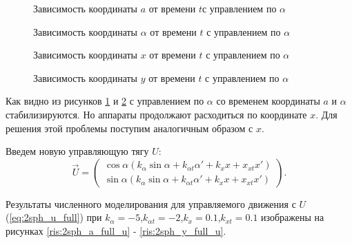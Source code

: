 \begin{figure}[H]
	\caption{Зависимость координаты $a$ от времени $t$с управлением по $\alpha$}
	\label{ris:2sph_a_alpha_u}
\end{figure}
\begin{figure}[H]
	\caption{Зависимость координаты $\alpha$ от времени $t$ с управлением по $\alpha$}
	\label{ris:2sph_alpha_alpha_u}
\end{figure} 
\begin{figure}[H]
	\caption{Зависимость координаты $x$ от времени $t$ с управлением по $\alpha$}
	\label{ris:2sph_x_alpha_u}
\end{figure} 
\begin{figure}[H]
	\caption{Зависимость координаты $y$ от времени $t$ с управлением по $\alpha$}
	\label{ris:2sph_y_alpha_u}
\end{figure} 

Как видно из рисунков \ref{ris:2sph_a_alpha_u} и \ref{ris:2sph_alpha_alpha_u} с управлением по $\alpha$ со временем координаты $a$ и $\alpha$ стабилизируются.
Но аппараты продолжают расходиться по координате $x$.
Для решения этой проблемы поступим аналогичным образом с $x$.

Введем новую управляющую тягу $U$:
\begin{equation}
\label{eq:2sph_u_full}
	\vec{U} = 
	\begin{pmatrix}
		\cos \alpha \left(k_\alpha \sin \alpha + k_{\alpha t}\alpha' + k_x x + x_{xt} x'\right)\\
		\sin \alpha \left(k_\alpha \sin \alpha + k_{\alpha t}\alpha' + k_x x + x_{xt} x'\right)
	\end{pmatrix}.
\end{equation}

Результаты численного моделирования для управляемого движения с $U$ (\ref{eq:2sph_u_full}) при $k_\alpha = -5$,$k_{\alpha t} = -2$,$k_x = 0.1$,$k_{x t} = 0.1$ изображены на рисунках \ref{ris:2sph_a_full_u} - \ref{ris:2sph_y_full_u}.


